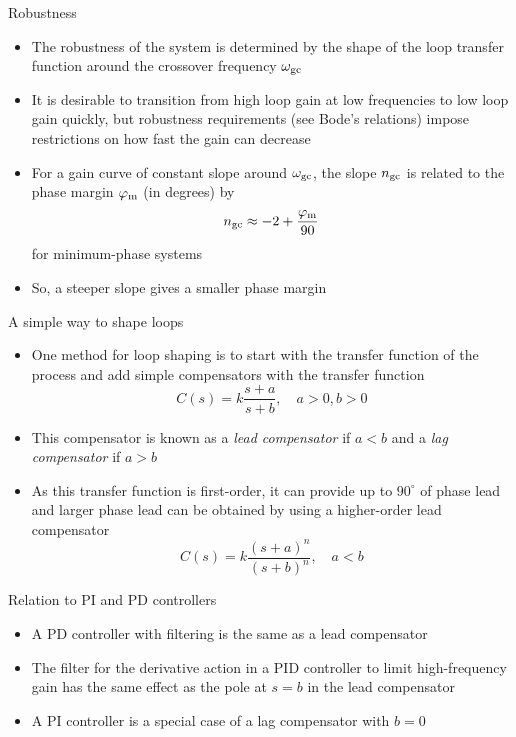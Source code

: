 \documentclass[10pt]{beamer-control}
\begin{document}
\begin{frame}{Robustness}
\begin{itemize}
	\item The robustness of the system is determined by the shape of the loop transfer function around the crossover frequency $\omega_{\text{gc}}$
	\item It is desirable to transition from high loop gain at low frequencies to low loop gain quickly, but robustness requirements (see Bode's relations) impose restrictions on how fast the gain can decrease
	\item For a gain curve of constant slope around $\omega_{\text{gc}}$, the slope $n_{\text{gc}}$ is related to the phase margin $\varphi_{\text{m}}$ (in degrees) by
	\begin{equation}n_{\text{gc}} \approx -2 + \frac{\varphi_{\text{m}}}{90}\end{equation}
	for minimum-phase systems
	\item So, a steeper slope gives a smaller phase margin
\end{itemize}
\end{frame}



\begin{frame}{A simple way to shape loops}
\begin{itemize}
\item One method for loop shaping is to start with the transfer function of the process and add simple compensators with the transfer function
\begin{equation}C(s)=k\frac{s+a}{s+b}, \quad a>0, b>0\end{equation}
\item This compensator is known as a \textit{lead compensator} if $a<b$ and a \textit{lag compensator} if $a>b$
\item As this transfer function is first-order, it can provide up to $90^\circ$ of phase lead and larger phase lead can be obtained by using a higher-order lead compensator
\begin{equation}C(s)=k\frac{(s+a)^n}{(s+b)^n}, \quad a<b\end{equation}
\end{itemize}
\end{frame}

\begin{frame}{Relation to PI and PD controllers}
\begin{itemize}
	\item A PD controller with filtering is the same as a lead compensator
	\item The filter for the derivative action in a PID controller to limit high-frequency gain has the same effect as the pole at $s=b$ in the lead compensator
	\item A PI controller is a special case of a lag compensator with $b=0$
\end{itemize}
\end{frame}
\end{document}
